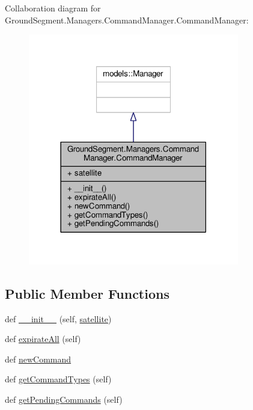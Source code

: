 Collaboration diagram for Ground\+Segment.\+Managers.\+Command\+Manager.\+Command\+Manager\+:\nopagebreak
\begin{figure}[H]
\begin{center}
\leavevmode
\includegraphics[width=261pt]{class_ground_segment_1_1_managers_1_1_command_manager_1_1_command_manager__coll__graph}
\end{center}
\end{figure}
\subsection*{Public Member Functions}
\begin{DoxyCompactItemize}
\item 
def \hyperlink{class_ground_segment_1_1_managers_1_1_command_manager_1_1_command_manager_a40a8030469798737cb9b7f3cc09ce5de}{\+\_\+\+\_\+init\+\_\+\+\_\+} (self, \hyperlink{class_ground_segment_1_1_managers_1_1_command_manager_1_1_command_manager_aabee387e15ec13296bda91fe638b7064}{satellite})
\item 
def \hyperlink{class_ground_segment_1_1_managers_1_1_command_manager_1_1_command_manager_ad019be8faf5b53965496c7ef2b10667c}{expirate\+All} (self)
\item 
def \hyperlink{class_ground_segment_1_1_managers_1_1_command_manager_1_1_command_manager_aa0b1eda2f36ff2db38121ac6bc769d47}{new\+Command}
\item 
def \hyperlink{class_ground_segment_1_1_managers_1_1_command_manager_1_1_command_manager_a8f281eae48cba4b7d2cd8c4e06712c44}{get\+Command\+Types} (self)
\item 
def \hyperlink{class_ground_segment_1_1_managers_1_1_command_manager_1_1_command_manager_a17a09b602e86f74c74cfd1ebe3dfe832}{get\+Pending\+Commands} (self)
\end{DoxyCompactItemize}
